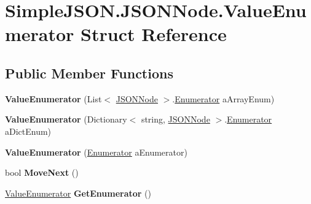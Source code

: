 \hypertarget{structSimpleJSON_1_1JSONNode_1_1ValueEnumerator}{}\section{Simple\+J\+S\+O\+N.\+J\+S\+O\+N\+Node.\+Value\+Enumerator Struct Reference}
\label{structSimpleJSON_1_1JSONNode_1_1ValueEnumerator}
\subsection*{Public Member Functions}
\begin{DoxyCompactItemize}
\item 
{\bfseries Value\+Enumerator} (List$<$ \hyperlink{classSimpleJSON_1_1JSONNode}{J\+S\+O\+N\+Node} $>$.\hyperlink{structSimpleJSON_1_1JSONNode_1_1Enumerator}{Enumerator} a\+Array\+Enum)\hypertarget{structSimpleJSON_1_1JSONNode_1_1ValueEnumerator_a76344ba59d08a80f4bd2f4f67547c584}{}\label{structSimpleJSON_1_1JSONNode_1_1ValueEnumerator_a76344ba59d08a80f4bd2f4f67547c584}

\item 
{\bfseries Value\+Enumerator} (Dictionary$<$ string, \hyperlink{classSimpleJSON_1_1JSONNode}{J\+S\+O\+N\+Node} $>$.\hyperlink{structSimpleJSON_1_1JSONNode_1_1Enumerator}{Enumerator} a\+Dict\+Enum)\hypertarget{structSimpleJSON_1_1JSONNode_1_1ValueEnumerator_a1869800d4a64f4e0db316e3369515fe0}{}\label{structSimpleJSON_1_1JSONNode_1_1ValueEnumerator_a1869800d4a64f4e0db316e3369515fe0}

\item 
{\bfseries Value\+Enumerator} (\hyperlink{structSimpleJSON_1_1JSONNode_1_1Enumerator}{Enumerator} a\+Enumerator)\hypertarget{structSimpleJSON_1_1JSONNode_1_1ValueEnumerator_aa77f9678b91d158c949e186a19a7d6a3}{}\label{structSimpleJSON_1_1JSONNode_1_1ValueEnumerator_aa77f9678b91d158c949e186a19a7d6a3}

\item 
bool {\bfseries Move\+Next} ()\hypertarget{structSimpleJSON_1_1JSONNode_1_1ValueEnumerator_a38e0a67677187f9ec68e489da5822065}{}\label{structSimpleJSON_1_1JSONNode_1_1ValueEnumerator_a38e0a67677187f9ec68e489da5822065}

\item 
\hyperlink{structSimpleJSON_1_1JSONNode_1_1ValueEnumerator}{Value\+Enumerator} {\bfseries Get\+Enumerator} ()\hypertarget{structSimpleJSON_1_1JSONNode_1_1ValueEnumerator_a18a8cb8612309a0f5caad8581fdfb210}{}\label{structSimpleJSON_1_1JSONNode_1_1ValueEnumerator_a18a8cb8612309a0f5caad8581fdfb210}

\end{DoxyCompactItemize}
